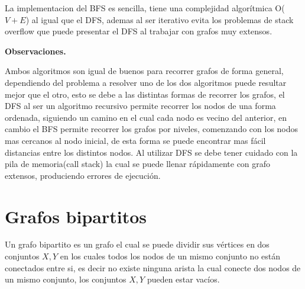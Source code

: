 \documentclass[12pt, a4paper]{article}
\newcommand\cppfile[2][]{

}
\newcommand{\subtitulo}[1]{\begin{center}\textbf{#1}\end{center}}
\begin{document}
	La implementacion del BFS es sencilla, tiene una complejidad algorítmica O($V+E$) al igual que el DFS, ademas al 
	ser iterativo evita los problemas de stack overflow que puede presentar el DFS al trabajar con grafos muy extensos.	
	\cppfile[8-25]{Grafos/codigos/BFS.cpp}
	
	\subtitulo{Observaciones.}
	
	Ambos algoritmos son igual de buenos para recorrer grafos de forma general, dependiendo del problema a resolver
	uno de los dos algoritmos puede resultar mejor que el otro, esto se debe a las distintas formas de recorrer
	los grafos, el DFS al ser un algoritmo recursivo permite recorrer los nodos de una forma ordenada, siguiendo un
	camino en el cual cada nodo es vecino del anterior, en cambio el BFS permite recorrer los grafos por niveles, 
	comenzando con los nodos mas cercanos al nodo inicial, de esta forma se puede encontrar mas fácil distancias entre
	los distintos nodos. Al utilizar DFS se debe tener cuidado con la pila de memoria(call stack) la cual se puede
	llenar rápidamente con grafo extensos, produciendo errores de ejecución.
	
	\section{Grafos bipartitos}
	
	Un grafo bipartito es un grafo el cual se puede dividir sus vértices en dos conjuntos ${X, Y}$ en los cuales
	todos los nodos de un mismo conjunto no están conectados entre si, es decir no existe ninguna arista la cual
	conecte dos nodos de un mismo conjunto, los conjuntos ${X, Y}$ pueden estar vacíos.
	
\end{document}
